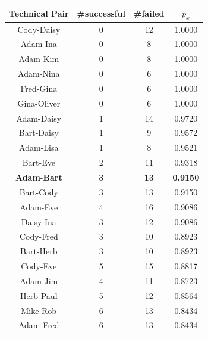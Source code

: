 \documentclass{sig-alternate}
\begin{document}
\begin{table}[t]
\centering
\begin{tabular}{cccc}
\toprule
Technical Pair & \#successful & \#failed & $p_x$\\
\midrule
Cody-Daisy&  0 & 12 & 1.0000 \\
Adam-Ina & 0 & \phantom{1}8 & 1.0000 \\
Adam-Kim& 0 & \phantom{1}8 & 1.0000 \\
Adam-Nina & 0 & \phantom{1}6 & 1.0000 \\
Fred-Gina& 0 & \phantom{1}6 & 1.0000 \\
Gina-Oliver & 0 & \phantom{1}6 & 1.0000 \\
Adam-Daisy& 1 & 14 & 0.9720\\%
Bart-Daisy& 1 & \phantom{1}9 & 0.9572\\%
Adam-Lisa& 1 & \phantom{1}8 & 0.9521\\%
Bart-Eve & 2 & 11 & 0.9318\\%
\textbf{Adam}-\textbf{Bart}& \textbf{3} & \textbf{13} & \textbf{0.9150}\\%
Bart-Cody & 3 & 13 & 0.9150\\%
Adam-Eve & 4 & 16 & 0.9086\\%
Daisy-Ina & 3 & 12 & 0.9086\\%
Cody-Fred& 3 & 10 & 0.8923\\%
Bart-Herb & 3 & 10 & 0.8923\\%
Cody-Eve & 5 & 15 & 0.8817\\%
Adam-Jim & 4 & 11 & 0.8723\\%
Herb-Paul & 5 & 12 & 0.8564\\%
Mike-Rob& 6 & 13 & 0.8434\\%
Adam-Fred & 6 & 13 & 0.8434\\%
%

\end{tabular}
\end{table}
\end{document}

